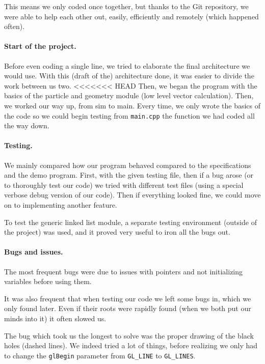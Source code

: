 \documentclass[a4paper]{article} %
\begin{document}
\begin{multicols*}{2}
This means we only coded once together, but thanks to the Git repository,
we were able to help each other out, easily, efficiently and remotely (which happened often).

\paragraph{Start of the project.} Before even coding a single line, we tried to elaborate the final
architecture we would use. With this (draft of the) architecture done, it was easier
to divide the work between us two.
<<<<<<< HEAD
Then, we began the program with the basics of the particle and geometry module (low level vector calculation).
Then, we worked our way up, from sim to main. Every time, we only wrote the basics of the code so we could begin testing from \texttt{main.cpp}
the function we had coded all the way down.

\paragraph{Testing.}
We mainly compared how our program behaved compared to the specifications and the demo program.
First, with the given testing file, then if a bug arose (or to thoroughly test our code)
we tried with different test files (using a special verbose debug version of our code).
Then if everything looked fine, we could move on to implementing another feature.

To test the generic linked list module, a separate testing environment (outside of the project)
was used, and it proved very useful to iron all the bugs out.

\paragraph{Bugs and issues.}
The most frequent bugs were due to issues with pointers and not initializing variables before using them.

It was also frequent that when testing our code we left some bugs in, which we only found later.
Even if their roots were rapidly found (when we both put our minds into it) it often slowed us.

The bug which took us the longest to solve was the proper drawing of the black holes (dashed lines).
We indeed tried a lot of things, before realizing we only had to change the \texttt{glBegin} parameter from \texttt{GL\_LINE} to \texttt{GL\_LINES}.



\end{multicols*}
\end{document}
